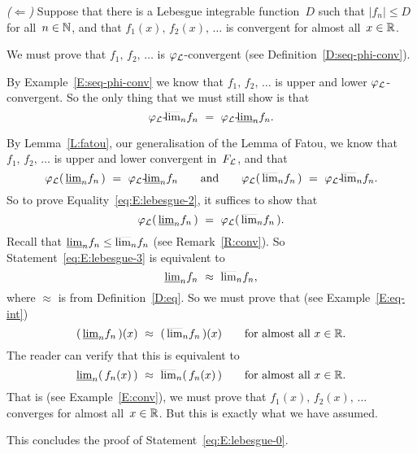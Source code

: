 \documentclass[main.tex]{subfiles}
\begin{document}
\begin{ex}
\vspace{.3em}
\emph{($\Longleftarrow$)}
Suppose that there is a Lebesgue integrable function~$D$
such that $|f_n|\leq D$ for all~$n\in\mathbb{N}$,
and that  $f_1(x),\,f_2(x),\,\dotsc$
is convergent for almost all~$x\in\mathbb{R}$.

We must prove that $f_1,\,f_2,\,\dotsc$
is $\varphi_{\mathcal{L}}$-convergent (see Definition~\ref{D:seq-phi-conv}).

By Example~\ref{E:seq-phi-conv}
we know that $f_1,\,f_2,\,\dotsc$ is upper and lower
$\varphi_{\mathcal{L}}$-convergent.
So the only thing that we must still show is
that 
\begin{equation}
\label{eq:E:lebesgue-2}
{\varphi_{\mathcal{L}}}\text{-}\!\smash{\overline{\lim}_{n}} f_n \ =\  {\varphi_{\mathcal{L}}}\text{-}\!\smash{\underline{\lim}_{n}} f_n.
\end{equation}

By Lemma~\ref{L:fatou}, our generalisation of the Lemma of Fatou,
we know that $f_1,\,f_2,\,\dotsc$
is upper and lower convergent in~$F_{\mathcal{L}}$,
and that 
\begin{equation*}
\Lphi(\,\llim{n} f_n\,) \ =\ 
\pllim\Lphi{n} f_n
\qquad\text{and}\qquad
\Lphi(\,\ulim{n} f_n\,) \ =\ 
\pulim\Lphi{n} f_n.
\end{equation*}
So to prove Equality~\eqref{eq:E:lebesgue-2},
it suffices to show that 
\begin{equation}
\label{eq:E:lebesgue-3}
\varphi_{\mathcal{L}}(\,\smash{\underline{\lim}_{n}} f_n\,) \ =\  \varphi_{\mathcal{L}}(\,\smash{\overline{\lim}_{n}} f_n\,).
\end{equation}
Recall that $\smash{\underline{\lim}_{n}}f_n \leq \smash{\overline{\lim}_{n}}f_n$
(see Remark~\ref{R:conv}).
So Statement~\ref{eq:E:lebesgue-3}
is equivalent to 
\begin{equation*}
\smash{\underline{\lim}_{n}} f_n \ \approx\  \smash{\overline{\lim}_{n}} f_n,
\end{equation*}
where $\approx$ is from Definition~\ref{D:eq}.
So we must prove that (see Example~\ref{E:eq-int})
\begin{equation*}
(\,\smash{\underline{\lim}_{n}} f_n\,) (x)\ \approx\  (\,\smash{\overline{\lim}_{n}} f_n\,)(x)
\qquad\text{for almost all $x\in\mathbb{R}$}.
\end{equation*}
The reader can verify that this is equivalent to
\begin{equation*}
\smash{\underline{\lim}_{n}} (\, f_n (x)\,)\ \approx\  \smash{\overline{\lim}_{n}} (\,f_n(x)\,)
\qquad\text{for almost all $x\in\mathbb{R}$}.
\end{equation*}
That is (see Example~\ref{E:conv}),
we must prove that $f_1(x),\,f_2(x),\,\dotsc$
converges for almost all~$x\in\mathbb{R}$.
But this is exactly what we have assumed.

This concludes the proof of Statement~\eqref{eq:E:lebesgue-0}.


\end{ex}
\end{document}
